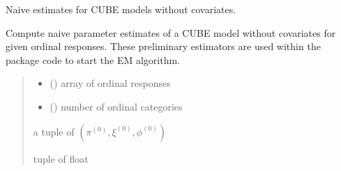 \documentclass[letterpaper,10pt,english]{sphinxmanual}
\begin{document}

\begin{fulllineitems}
\label{\detokenize{cubmods:cubmods.cube.init_theta}}
\pysigstartsignatures
{}
\pysigstopsignatures
\sphinxAtStartPar
Naive estimates for CUBE models without covariates.

\sphinxAtStartPar
Compute naive parameter estimates of a CUBE model without covariates for given ordinal responses. 
These preliminary estimators are used within the package code to start the E\sphinxhyphen{}M algorithm.
\begin{quote}\begin{description}
\begin{itemize}
\item {} 
\sphinxAtStartPar
{} () \textendash{} array of ordinal responses

\item {} 
\sphinxAtStartPar
{} () \textendash{} number of ordinal categories

\end{itemize}

\sphinxAtStartPar
a tuple of \((\pi^{(0)}, \xi^{(0)}, \phi^{(0)})\)

\sphinxAtStartPar
tuple of float

\end{description}\end{quote}

\end{fulllineitems}

\end{document}
